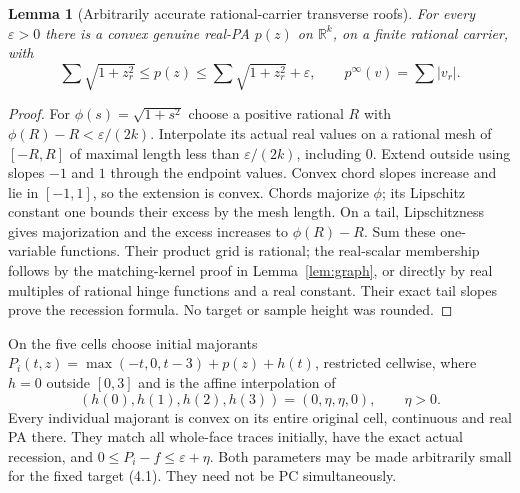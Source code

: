\documentclass[11pt]{article}
\newtheorem{lemma}[theorem]{Lemma}
\newcommand{\R}{\mathbb R}
\begin{document}
\begin{lemma}[Arbitrarily accurate rational-carrier transverse roofs]\label{lem:roof}
For every $\varepsilon>0$ there is a convex genuine real-PA $p(z)$ on $\R^k$, on a finite rational carrier, with
\[
 \sum\sqrt{1+z_r^2}\leq p(z)\leq\sum\sqrt{1+z_r^2}+\varepsilon,
 \qquad p^\infty(v)=\sum|v_r|.
\]
\end{lemma}
\begin{proof}
For $\phi(s)=\sqrt{1+s^2}$ choose a positive rational $R$ with $\phi(R)-R<\varepsilon/(2k)$. Interpolate its actual real values on a rational mesh of $[-R,R]$ of maximal length less than $\varepsilon/(2k)$, including $0$. Extend outside using slopes $-1$ and $1$ through the endpoint values. Convex chord slopes increase and lie in $[-1,1]$, so the extension is convex. Chords majorize $\phi$; its Lipschitz constant one bounds their excess by the mesh length. On a tail, Lipschitzness gives majorization and the excess increases to $\phi(R)-R$. Sum these one-variable functions. Their product grid is rational; the real-scalar membership follows by the matching-kernel proof in Lemma~\ref{lem:graph}, or directly by real multiples of rational hinge functions and a real constant. Their exact tail slopes prove the recession formula. No target or sample height was rounded.
\end{proof}

On the five cells choose initial majorants $P_i(t,z)=\max(-t,0,t-3)+p(z)+h(t)$, restricted cellwise, where $h=0$ outside $[0,3]$ and is the affine interpolation of
\[
 (h(0),h(1),h(2),h(3))=(0,\eta,\eta,0),\qquad \eta>0.                \tag{4.2}
\]
Every individual majorant is convex on its entire original cell, continuous and real PA there. They match all whole-face traces initially, have the exact actual recession, and $0\leq P_i-f\leq\varepsilon+\eta$. Both parameters may be made arbitrarily small for the fixed target (4.1). They need not be PC simultaneously.
\end{document}
